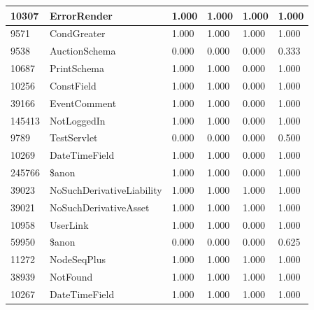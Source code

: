 \documentclass[a4paper]{article}
\newlength{\DUtablewidth} %
\begin{document}
\begin{longtable*}[c]{|p{0.160\DUtablewidth}|p{0.160\DUtablewidth}|p{0.160\DUtablewidth}|p{0.160\DUtablewidth}|p{0.160\DUtablewidth}|p{0.160\DUtablewidth}|}
10307
 & 
ErrorRender
 & 
1.000
 & 
1.000
 & 
1.000
 & 
1.000
 \\
\hline

9571
 & 
CondGreater
 & 
1.000
 & 
1.000
 & 
1.000
 & 
1.000
 \\
\hline

9538
 & 
AuctionSchema
 & 
0.000
 & 
0.000
 & 
0.000
 & 
0.333
 \\
\hline

10687
 & 
PrintSchema
 & 
1.000
 & 
1.000
 & 
0.000
 & 
1.000
 \\
\hline

10256
 & 
ConstField
 & 
1.000
 & 
1.000
 & 
0.000
 & 
1.000
 \\
\hline

39166
 & 
EventComment
 & 
1.000
 & 
1.000
 & 
0.000
 & 
1.000
 \\
\hline

145413
 & 
NotLoggedIn
 & 
1.000
 & 
1.000
 & 
0.000
 & 
1.000
 \\
\hline

9789
 & 
TestServlet
 & 
0.000
 & 
0.000
 & 
0.000
 & 
0.500
 \\
\hline

10269
 & 
DateTimeField
 & 
1.000
 & 
1.000
 & 
0.000
 & 
1.000
 \\
\hline

245766
 & 
\$anon
 & 
1.000
 & 
1.000
 & 
0.000
 & 
1.000
 \\
\hline

39023
 & 
NoSuchDerivativeLiability
 & 
1.000
 & 
1.000
 & 
1.000
 & 
1.000
 \\
\hline

39021
 & 
NoSuchDerivativeAsset
 & 
1.000
 & 
1.000
 & 
1.000
 & 
1.000
 \\
\hline

10958
 & 
UserLink
 & 
1.000
 & 
1.000
 & 
0.000
 & 
1.000
 \\
\hline

59950
 & 
\$anon
 & 
0.000
 & 
0.000
 & 
0.000
 & 
0.625
 \\
\hline

11272
 & 
NodeSeqPlus
 & 
1.000
 & 
1.000
 & 
1.000
 & 
1.000
 \\
\hline

38939
 & 
NotFound
 & 
1.000
 & 
1.000
 & 
1.000
 & 
1.000
 \\
\hline

10267
 & 
DateTimeField
 & 
1.000
 & 
1.000
 & 
1.000
 & 
1.000
 \\
\hline


\end{longtable*}
\end{document}
